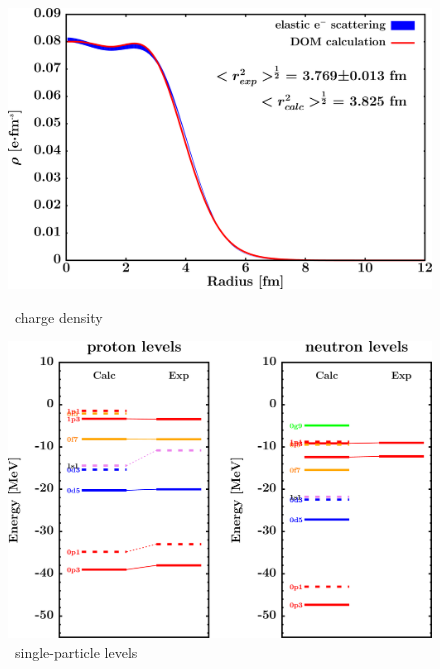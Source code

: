 \begin{figure}[hbtp]
    \centering
    \begin{minipage}{0.42\textwidth}
        \centering
        \includegraphics[width=\textwidth]{figures/ni58_chargeDensity.png}
        \caption*{\niEight\ charge density}
        \label{DOMFitData_ni58_chargeDensity}
    \end{minipage}\hspace{6pt}
    \begin{minipage}{0.42\textwidth}
        \centering
        \includegraphics[width=\textwidth]{figures/ni58_SPLevels.png}
        \caption*{\niEight\ single-particle levels}
        \label{DOMFitData_ni58_SPLevels}
    \end{minipage}
\end{figure}
